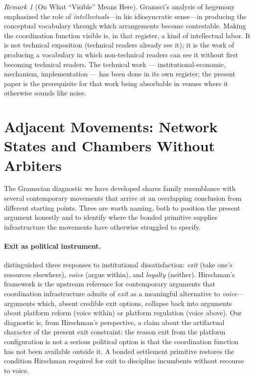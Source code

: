 \documentclass[11pt,a4paper]{article}
\theoremstyle{remark}
\newtheorem{remark}{Remark}[section]
\begin{document}
\begin{remark}[On What ``Visible'' Means Here]
Gramsci's analysis of hegemony emphasized the role of
\emph{intellectuals}---in his idiosyncratic sense---in producing
the conceptual vocabulary through which arrangements become
contestable. Making the coordination function visible is, in that
register, a kind of intellectual labor. It is not technical
exposition (technical readers already see it); it is the work of
producing a vocabulary in which non-technical readers can see it
without first becoming technical readers. The technical work
--- institutional-economic, mechanism, implementation --- has
been done in its own register; the present paper is the
prerequisite for that work being absorbable in venues where it
otherwise sounds like noise.
\end{remark}

\section{Adjacent Movements: Network States and Chambers Without Arbiters}
\label{sec:adjacent}

The Gramscian diagnostic we have developed shares family resemblance
with several contemporary movements that arrive at an overlapping
conclusion from different starting points. Three are worth naming,
both to position the present argument honestly and to identify where
the bonded primitive supplies infrastructure the movements have
otherwise struggled to specify.

\paragraph{Exit as political instrument.}
\citet{hirschman1970exit} distinguished three responses to
institutional dissatisfaction: \emph{exit} (take one's resources
elsewhere), \emph{voice} (argue within), and \emph{loyalty} (neither).
Hirschman's framework is the upstream reference for contemporary
arguments that coordination infrastructure admits of \emph{exit} as
a meaningful alternative to \emph{voice}---arguments which, absent
credible exit options, collapse back into arguments about platform
reform (voice within) or platform regulation (voice above). Our
diagnostic is, from Hirschman's perspective, a claim about the
artifactual character of the present exit constraint: the reason
exit from the platform configuration is not a serious political
option is that the coordination function has not been available
outside it. A bonded settlement primitive restores the condition
Hirschman required for exit to discipline incumbents without
recourse to voice.
\end{document}

